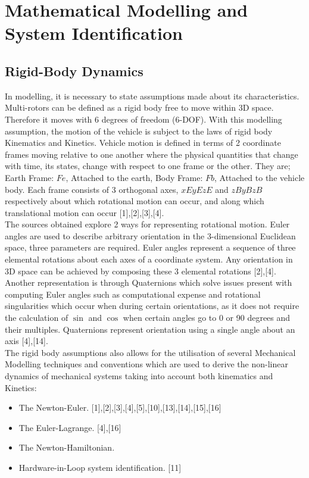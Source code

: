 \documentclass[12pt,a4paper,twoside]{report}
\begin{document}
		\section*{Mathematical Modelling and System Identification}
		
			\subsection*{Rigid-Body Dynamics}
			
				In modelling, it is necessary to state assumptions made about its characteristics. Multi-rotors can be  defined as a rigid body free to move within 3D space. Therefore it moves with 6 degrees of freedom (6-DOF). With this modelling assumption,  the motion of the vehicle is subject to the laws of rigid body Kinematics and Kinetics. Vehicle motion is defined in terms of 2 coordinate frames moving relative to one another where the physical quantities that change with time, its states, change with respect to one frame or the other. They are; Earth Frame: \(Fe\), Attached to the earth, Body Frame: \(Fb\), Attached to the vehicle body. Each frame consists of 3 orthogonal axes, \(xE yE zE\) and \(zB yB zB\) respectively about which rotational motion can occur, and along which translational motion can occur [1],[2],[3],[4].
				\\
				The sources obtained explore 2 ways for representing rotational motion. Euler angles are used to describe arbitrary orientation in the 3-dimensional Euclidean space, three parameters are required. Euler angles represent a sequence of three elemental rotations about each axes of a coordinate system. Any orientation in 3D space can be achieved by composing these 3 elemental rotations [2],[4]. Another representation is through Quaternions which solve issues present with computing Euler angles such as computational expense and rotational singularities which occur when during certain orientations, as it does not require the calculation of $\sin$ and $\cos$ when certain angles go to 0 or 90 degrees and their multiples. Quaternions represent orientation using a single angle about an axis [4],[14].
				\\ 
				The rigid body assumptions also allows for the utilisation of several Mechanical Modelling techniques and conventions which are used to derive the non-linear dynamics of mechanical systems taking into account both kinematics and Kinetics:
				
				\begin{itemize}
					\item 
						The Newton-Euler. [1],[2],[3],[4],[5],[10],[13],[14],[15],[16]
					\item
						The Euler-Lagrange. [4],[16]
					\item
						The Newton-Hamiltonian.
					\item 
						Hardware-in-Loop system identification. [11]
				\end{itemize}
				
\end{document}
